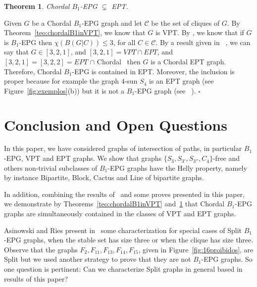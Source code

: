 \documentclass[9pt]{entcs}
\newtheorem{teo}[thm]{Theorem}%
\begin{document}
\begin{teo}\label{teo:b1epgept}
Chordal $B_1$-EPG $\subsetneq$ EPT. 
\end{teo}

\begin{pf}
Given $G$ be a  Chordal $B_1$-EPG graph and let  $\mathcal{C}$  be the set of cliques of $G$. By Theorem~\ref{teo:chordalB1inVPT}, we know that $G$ is VPT. By \cite{golumbic2009}, we know that if $G$ is $B_1$-EPG then $\chi (B(G|C))\leq 3$,  for all $C \in \mathcal{C}$. By a result given in ~\cite{alcon2014recognizing}, we can say that $G \in [3,2,1]$, and $[3,2,1] = VPT \cap EPT$, and $[3,2,1] = [3,2,2] = EPT$ $\cap$ Chordal~\cite{golumbic1985} then $G$ is a Chordal EPT graph. Therefore, Chordal $B_1$-EPG is contained in EPT. Moreover, the inclusion is proper because for example the graph $4$-sun $S_4$ is an EPT graph (see Figure~\ref{fig:exemplos}(b)) but it is not a $B_1$-EPG graph (see ~\cite{golumbic2009}).
 $\square$\end{pf} 



\section{Conclusion and Open Questions}

In this paper, we have considered graphs of intersection of paths, in particular $B_1$-EPG, VPT and EPT graphs. We show that graphs $\{S_3, S_{3'},S_{3''},C_4\}$-free and others non-trivial subclasses of  $B_1$-EPG graphs have the Helly property, namely by instance Bipartite, Block, Cactus and Line of bipartite graphs. 
  
  In addition, combining the results of~\cite{alcon2014recognizing,Asinowski2009, golumbic2009} and some proves  presented in this paper, we demonstrate by  Theorems~\ref{teo:chordalB1inVPT} and~\ref{teo:b1epgept} that Chordal $B_1$-EPG graphs are simultaneously contained in the classes of VPT and EPT graphs.  
 
 

Asinowski and Ries present in~\cite{ries2009} some characterization for special cases of Split $B_1$-EPG graphs, when the stable set has size three or when the clique has size three. Observe that the graphs $F_2, F_{11}, F_{13}, F_{14}, F_{15}$, given in Figure~\ref{fig:16proibidos}, are Split but we used another strategy to prove that they are not $B_1$-EPG graphs. So one question is pertinent: Can we characterize Split graphs in general based in results of this paper? 
\end{document}
